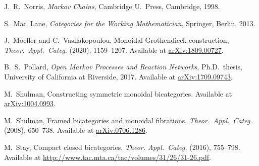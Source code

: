 \documentclass[oneside,final]{ucr}
\theoremstyle{definition}
\newcommand{\define}[1]{{\bf \boldmath #1}}
\begin{document}
{\begin{thebibliography}{1}
 J.\ R.\ Norris, \textsl{Markov Chains}, Cambridge U.\ Press, Cambridge, 1998. 

 S.\ Mac\ Lane, \textsl{Categories for the Working Mathematician},
Springer, Berlin, 2013.

 J.\ Moeller and C.\ Vasilakopoulou, Monoidal Grothendieck construction, \textsl{Theor.\ Appl.\ Categ.}
\define{35} (2020), 1159--1207. Available at \href{https://arxiv.org/abs/1809.00727}{arXiv:1809.00727}.

 B.\ S.\ Pollard, \textsl{Open Markov Processes and Reaction Networks}, 
Ph.D.\ thesis, University of California at Riverside, 2017.   Available at \href{https://arxiv.org/abs/1709.09743}{arXiv:1709.09743}.

 M.\ Shulman, Constructing symmetric monoidal bicategories. Available at \href{http://arxiv.org/abs/1004.0993}{arXiv:1004.0993}.

 M.\ Shulman, Framed bicategories and monoidal fibrations, \textsl{Theor.\ Appl.\ Categ.}
\define{20} (2008), 650--738. Available at \href{https://arxiv.org/abs/0706.1286}{arXiv:0706.1286}.

 M.\ Stay, Compact closed bicategories, \textsl{Theor. Appl.\ Categ.}
\define{31} (2016), 755--798.  Available at \href{http://www.tac.mta.ca/tac/volumes/31/26/31-26.pdf}{http://www.tac.mta.ca/tac/volumes/31/26/31-26.pdf}.

\end{thebibliography}
}
\end{document}
